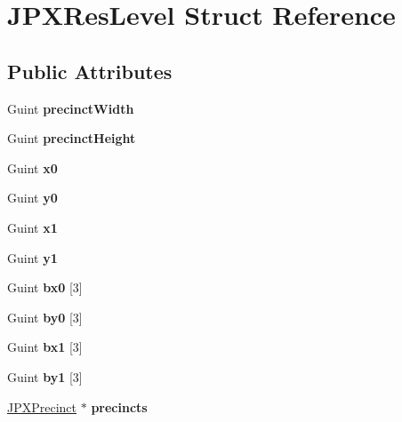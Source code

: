 \hypertarget{struct_j_p_x_res_level}{}\section{J\+P\+X\+Res\+Level Struct Reference}
\label{struct_j_p_x_res_level}
\subsection*{Public Attributes}
\begin{DoxyCompactItemize}
\item 
\mbox{\label{struct_j_p_x_res_level_a89b6a90ac8958728b8f828d79e358e5c}} 
Guint {\bfseries precinct\+Width}
\item 
\mbox{\label{struct_j_p_x_res_level_ae2a2a0b6bab5c411aa3398d1700dc09e}} 
Guint {\bfseries precinct\+Height}
\item 
\mbox{\label{struct_j_p_x_res_level_aea9bb264da7e7a6e8974a45845e39927}} 
Guint {\bfseries x0}
\item 
\mbox{\label{struct_j_p_x_res_level_a163f9c343e35d125a68875e02e50acf5}} 
Guint {\bfseries y0}
\item 
\mbox{\label{struct_j_p_x_res_level_a1c76d57df788f5303c8166ab2ea7f442}} 
Guint {\bfseries x1}
\item 
\mbox{\label{struct_j_p_x_res_level_a8003a6fc6b52ac1f678a9716377359c4}} 
Guint {\bfseries y1}
\item 
\mbox{\label{struct_j_p_x_res_level_a90d00331ec3874e7c6bf884eb6387080}} 
Guint {\bfseries bx0} \mbox{[}3\mbox{]}
\item 
\mbox{\label{struct_j_p_x_res_level_a821fda6d41348c3bbf0dc6ce585f315d}} 
Guint {\bfseries by0} \mbox{[}3\mbox{]}
\item 
\mbox{\label{struct_j_p_x_res_level_ab551412bf7bc8851fa7b09486b8bf732}} 
Guint {\bfseries bx1} \mbox{[}3\mbox{]}
\item 
\mbox{\label{struct_j_p_x_res_level_a08e4a83484d1333c7ddaeba7eee76596}} 
Guint {\bfseries by1} \mbox{[}3\mbox{]}
\item 
\mbox{\label{struct_j_p_x_res_level_a39187d01d867532e63fa8aa829a14140}} 
\hyperlink{struct_j_p_x_precinct}{J\+P\+X\+Precinct} $\ast$ {\bfseries precincts}
\end{DoxyCompactItemize}


